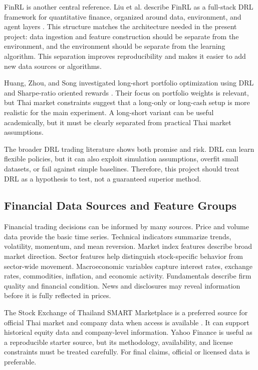 \documentclass[11pt]{article}
\begin{document}
FinRL is another central reference. Liu et al. describe FinRL as a full-stack DRL framework for quantitative finance, organized around data, environment, and agent layers \cite{finrl}. This structure matches the architecture needed in the present project: data ingestion and feature construction should be separate from the environment, and the environment should be separate from the learning algorithm. This separation improves reproducibility and makes it easier to add new data sources or algorithms.

Huang, Zhou, and Song investigated long-short portfolio optimization using DRL and Sharpe-ratio oriented rewards \cite{longshort}. Their focus on portfolio weights is relevant, but Thai market constraints suggest that a long-only or long-cash setup is more realistic for the main experiment. A long-short variant can be useful academically, but it must be clearly separated from practical Thai market assumptions.

The broader DRL trading literature shows both promise and risk. DRL can learn flexible policies, but it can also exploit simulation assumptions, overfit small datasets, or fail against simple baselines. Therefore, this project should treat DRL as a hypothesis to test, not a guaranteed superior method.

\subsection{Financial Data Sources and Feature Groups}
Financial trading decisions can be informed by many sources. Price and volume data provide the basic time series. Technical indicators summarize trends, volatility, momentum, and mean reversion. Market index features describe broad market direction. Sector features help distinguish stock-specific behavior from sector-wide movement. Macroeconomic variables capture interest rates, exchange rates, commodities, inflation, and economic activity. Fundamentals describe firm quality and financial condition. News and disclosures may reveal information before it is fully reflected in prices.

The Stock Exchange of Thailand SMART Marketplace is a preferred source for official Thai market and company data when access is available \cite{setsmart}. It can support historical equity data and company-level information. Yahoo Finance is useful as a reproducible starter source, but its methodology, availability, and license constraints must be treated carefully. For final claims, official or licensed data is preferable.
\end{document}
